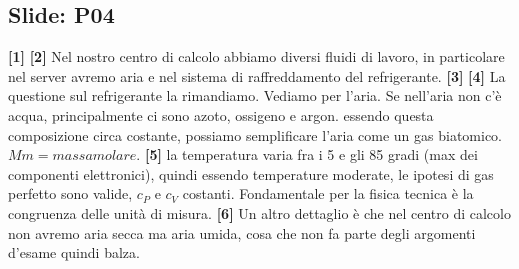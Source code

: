 \subsection*{Slide: P04}
\textbf{[1]}\;
\newline\textbf{[2]}\; Nel nostro centro di calcolo abbiamo diversi fluidi di lavoro, in particolare nel server avremo aria e nel sistema di raffreddamento del refrigerante.
\newline\textbf{[3]}\;
\newline\textbf{[4]}\; La questione sul refrigerante la rimandiamo. Vediamo per l'aria. Se nell'aria non c'è acqua, principalmente ci sono azoto, ossigeno e argon. essendo questa composizione circa costante, possiamo semplificare l'aria come un gas biatomico. $Mm = massa molare$.
\newline\textbf{[5]}\; la temperatura varia fra i 5 e gli 85 gradi (max dei componenti elettronici), quindi essendo temperature moderate, le ipotesi di gas perfetto sono valide, $c_P$ e $c_V$ costanti. Fondamentale per la fisica tecnica è la congruenza delle unità di misura.
\newline\textbf{[6]}\; Un altro dettaglio è che nel centro di calcolo non avremo aria secca ma aria umida, cosa che non fa parte degli argomenti d'esame quindi balza.